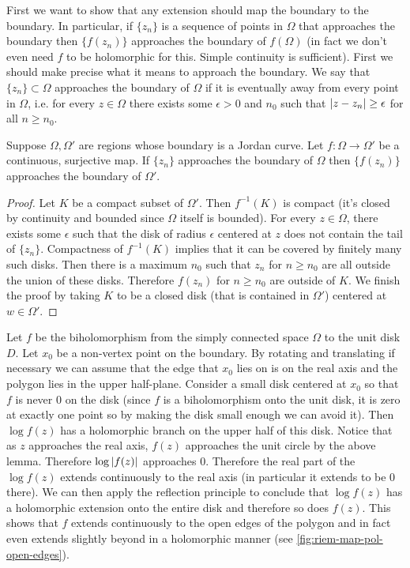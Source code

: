 First we want to show that any extension should map the boundary to the boundary. In particular, if $\{z_n\}$ is a sequence of points in $\Omega$ that approaches the boundary then $\{f(z_n)\}$ approaches the boundary of $f(\Omega)$ (in fact we don't even need $f$ to be holomorphic for this. Simple continuity is sufficient). First we should make precise what it means to approach the boundary. We say that $\{z_n\} \subset \Omega$ approaches the boundary of $\Omega$ if it is eventually away from every point in $\Omega$, i.e. for every $z \in \Omega$ there exists some $\epsilon > 0$ and $n_0$ such that $\left|z - z_n\right| \geq \epsilon$ for all $n \geq n_0$. 

\begin{lemma}
    Suppose $\Omega, \Omega'$ are regions whose boundary is a Jordan curve. Let $f: \Omega \to \Omega'$ be a continuous, surjective map. If $\{z_n\}$ approaches the boundary of $\Omega$ then $\{f(z_n)\}$ approaches the boundary of $\Omega'$. 
\end{lemma}
\begin{proof}
    Let $K$ be a compact subset of $\Omega'$. Then $f^{-1}(K)$ is compact (it's closed by continuity and bounded since $\Omega$ itself is bounded). For every $z \in \Omega$, there exists some $\epsilon$ such that the disk of radius $\epsilon$ centered at $z$ does not contain the tail of $\{z_n\}$. Compactness of $f^{-1}(K)$ implies that it can be covered by finitely many such disks. Then there is a maximum $n_0$ such that $z_n$ for $n \geq n_0$ are all outside the union of these disks. Therefore $f(z_n)$ for $n \geq n_0$ are outside of $K$. We finish the proof by taking $K$ to be a closed disk (that is contained in $\Omega'$) centered at $w \in \Omega'$. 
\end{proof}

Let $f$ be the biholomorphism from the simply connected space $\Omega$ to the unit disk $D$. Let $x_0$ be a non-vertex point on the boundary. By rotating and translating if necessary we can assume that the edge that $x_0$ lies on is on the real axis and the polygon lies in the upper half-plane. Consider a small disk centered at $x_0$ so that $f$ is never 0 on the disk (since $f$ is a biholomorphism onto the unit disk, it is zero at exactly one point so by making the disk small enough we can avoid it). Then $\log f(z)$ has a holomorphic branch on the upper half of this disk. Notice that as $z$ approaches the real axis, $f(z)$ approaches the unit circle by the above lemma. Therefore $\log \left|f(z)\right|$ approaches 0. Therefore the real part of the $\log f(z)$ extends continuously to the real axis (in particular it extends to be 0 there). We can then apply the reflection principle to conclude that $\log f(z)$ has a holomorphic extension onto the entire disk and therefore so does $f(z)$. This shows that $f$ extends continuously to the open edges of the polygon and in fact even extends slightly beyond in a holomorphic manner (see \autoref{fig:riem-map-pol-open-edges}). 

